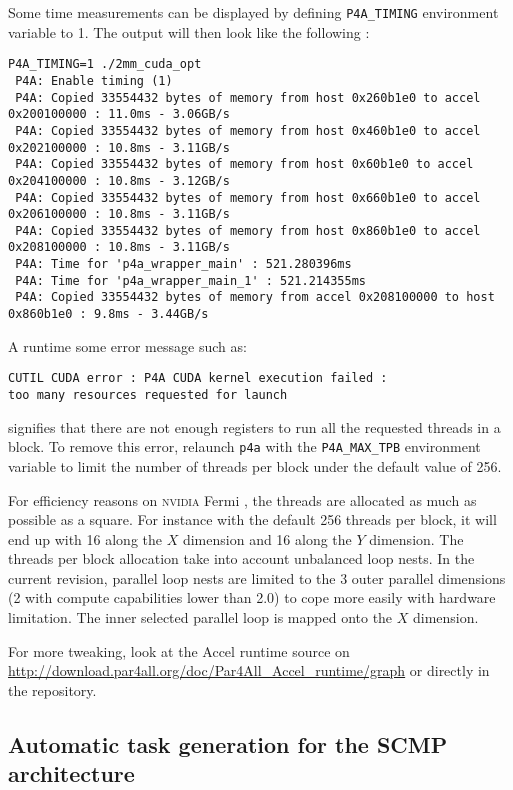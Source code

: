 \documentclass[a4paper]{article}
\begin{document}
Some time measurements can be displayed by defining
\verb|P4A_TIMING| environment variable to 1. The output will then look like the
following : {\scriptsize
\begin{verbatim}
P4A_TIMING=1 ./2mm_cuda_opt
 P4A: Enable timing (1)
 P4A: Copied 33554432 bytes of memory from host 0x260b1e0 to accel 0x200100000 : 11.0ms - 3.06GB/s
 P4A: Copied 33554432 bytes of memory from host 0x460b1e0 to accel 0x202100000 : 10.8ms - 3.11GB/s
 P4A: Copied 33554432 bytes of memory from host 0x60b1e0 to accel 0x204100000 : 10.8ms - 3.12GB/s
 P4A: Copied 33554432 bytes of memory from host 0x660b1e0 to accel 0x206100000 : 10.8ms - 3.11GB/s
 P4A: Copied 33554432 bytes of memory from host 0x860b1e0 to accel 0x208100000 : 10.8ms - 3.11GB/s
 P4A: Time for 'p4a_wrapper_main' : 521.280396ms
 P4A: Time for 'p4a_wrapper_main_1' : 521.214355ms
 P4A: Copied 33554432 bytes of memory from accel 0x208100000 to host 0x860b1e0 : 9.8ms - 3.44GB/s
\end{verbatim}
}


A runtime some error message such as:
\begin{verbatim}
CUTIL CUDA error : P4A CUDA kernel execution failed :
too many resources requested for launch
\end{verbatim}
signifies that there are not enough registers to run all the requested
threads in a block. To remove this error,
relaunch \texttt{p4a} with the \verb|P4A_MAX_TPB| environment variable to limit the
number of threads per block under the default value of 256.

For efficiency reasons on \textsc{nvidia} Fermi \Agpu, the threads are
allocated as much as possible as a square. For instance with the default 256 
threads per block, it will end up with 16 along the $X$ dimension and 16 along
the $Y$ dimension. The threads per block allocation take into account unbalanced 
loop nests. In the current revision, parallel loop nests are limited to the 3 
outer parallel dimensions (2 with compute capabilities lower than 2.0) to cope 
more easily with \Acuda \Agpu hardware limitation. The inner selected parallel 
loop is mapped onto the $X$ \Agpu dimension.

For more tweaking, look at the \Apfa Accel runtime source on
\url{http://download.par4all.org/doc/Par4All_Accel_runtime/graph} or
directly in the \Agit repository.


\subsection{Automatic task generation for the SCMP architecture}
\label{sec:scmp}
\end{document}
